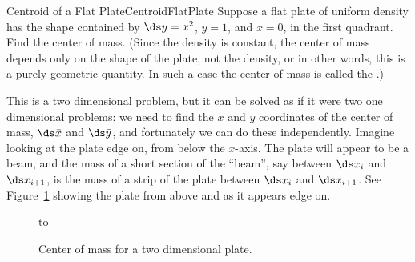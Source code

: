 \begin{example}{Centroid of a Flat Plate}{CentroidFlatPlate}
Suppose a flat plate of uniform density has the shape
contained by $\ds y=x^2$, $y=1$, and $x=0$, in the first quadrant. Find
the center of mass. (Since the density is constant, the center of mass
depends only on the shape of the plate, not the density, or in other
words, this is a purely geometric quantity. In such a case the center
of mass is called the .)
\end{example}
\begin{solution}
This is a two dimensional problem, but it can be solved as if it were
two one dimensional problems: we need to find the $x$ and $y$
coordinates of the center of mass, $\ds \bar x$ and $\ds \bar y$, and
fortunately we can do these independently. Imagine looking at the
plate edge on, from below the $x$-axis. The plate will appear to be a
beam, and the mass of a short section of the ``beam'', say between
$\ds x_i$ and $\ds x_{i+1}$, is the mass of a strip of the plate
between $\ds x_i$ and $\ds x_{i+1}$. See Figure~\ref{fig:twodcenterofmass}
showing the plate from above and as it appears edge on.

\begin{figure}[H]
\centerline{
\hbox to }
\caption{Center of mass for a two dimensional plate.}
\label{fig:twodcenterofmass}
\end{figure}


\end{solution}
